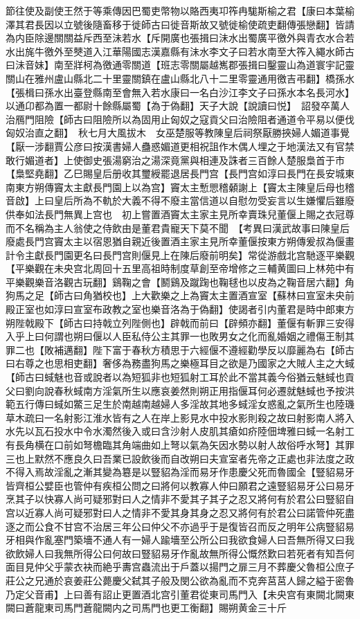 節往使及副使王然于等乘傳因巴蜀吏幣物以賂西夷卭筰冉駹斯榆之君【康曰本葉榆澤其君長因以立號後隨畜移于徙師古曰徙音斯故又號徙榆使疏吏翻傳張戀翻】皆請為内臣除邊關關益斥西至沬若水【斥開廣也張揖曰沬水出蜀廣平徼外與青衣水合若水出旄牛徼外至僰道入江華陽國志漢嘉縣有沬水李文子曰若水南至大筰入繩水師古曰沬音妹】南至牂柯為徼通零關道【班志零關屬越嶲郡張揖曰鑿靈山為道寰宇記靈關山在雅州盧山縣北二十里靈關鎮在盧山縣北八十二里零靈通用徼吉弔翻】橋孫水【張楫曰孫水出臺登縣南至會無入若水康曰一名白沙江李文子曰孫水本名長河水】以通卬都為置一都尉十餘縣屬蜀【為于偽翻】天子大說【說讀曰悦】　詔發卒萬人治鴈門阻險【師古曰阻險所以為固用止匈奴之寇貢父曰治險阻者通道令平易以便伐匈奴治直之翻】　秋七月大風拔木　女巫楚服等教陳皇后祠祭厭勝挾婦人媚道事覺【厭一涉翻賈公彦曰按漢書婦人蠱惑媚道更相祝詛作木偶人埋之于地漢法又有官禁敢行媚道者】上使御史張湯窮治之湯深竟黨與相連及誅者三百餘人楚服梟首于市【梟堅堯翻】乙巳賜皇后册收其璽綬罷退居長門宫【長門宫如淳曰長門在長安城東南東方朔傳竇太主獻長門園上以為宫】竇太主慙愳稽顙謝上【竇太主陳皇后母也稽音啟】上曰皇后所為不軌於大義不得不廢主當信道以自慰勿受妄言以生嫌懼后雖廢供奉如法長門無異上宫也　初上嘗置酒竇太主家主見所幸賣珠兒董偃上賜之衣冠尊而不名稱為主人翁使之侍飲由是董君貴寵天下莫不聞　【考異曰漢武故事曰陳皇后廢處長門宫竇太主以宿恩猶自親近後置酒主家主見所幸董偃按東方朔傳爰叔為偃畫計令主獻長門園更名曰長門宫則偃見上在陳后廢前明矣】常從游戲北宫馳逐平樂觀【平樂觀在未央宫北周回十五里高祖時制度草創至帝增修之三輔黄圖曰上林苑中有平樂觀樂音洛觀古玩翻】鷄鞠之會【鬭鷄及蹴踘也鞠毬也以皮為之鞠音居六翻】角狗馬之足【師古曰角猶校也】上大歡樂之上為竇太主置酒宣室【蘇林曰宣室未央前殿正室也如淳曰宣室布政教之室也樂音洛為于偽翻】使謁者引内董君是時中郎東方朔陛戟殿下【師古曰持戟立列陛側也】辟戟而前曰【辟頻亦翻】董偃有斬罪三安得入乎上曰何謂也朔曰偃以人臣私侍公主其罪一也敗男女之化而亂婚姻之禮傷王制其罪二也【敗補邁翻】陛下富于春秋方積思于六經偃不遵經勸學反以靡麗為右【師古曰右尊之也思相吏翻】奢侈為務盡狗馬之樂極耳目之欲是乃國家之大賊人主之大蜮【師古曰蜮魅也音或說者以為短狐非也短狐射工耳於此不當其義今俗猶云魅蜮也貢父曰劉向說春秋蜮南方淫氣所生以應哀姜然則朔正用指偃耳何必遷就魅蜮也予按洪範五行傳曰蜮如鱉三足生於南越南越婦人多淫故其地多蜮淫女惑亂之氣所生也陸璣草木疏曰一名射影江淮水皆有之人在岸上影見水中投水影則殺之故曰射影南人將入水先以瓦石投水中令水濁然後入或曰含沙射人皮肌其瘡如疥陸佃埤雅曰蜮一名射工有長角横在口前如弩檐臨其角端曲如上弩以氣為矢因水勢以射人故俗呼水弩】其罪三也上默然不應良久曰吾業已設飲後而自改朔曰夫宣室者先帝之正處也非法度之政不得入焉故淫亂之漸其變為簒是以豎貂為淫而易牙作患慶父死而魯國全【豎貂易牙皆齊桓公嬖臣也管仲有疾桓公問之曰將何以教寡人仲曰願君之遠豎貂易牙公曰易牙烹其子以快寡人尚可疑邪對曰人之情非不愛其子其子之忍又將何有於君公曰豎貂自宫以近寡人尚可疑邪對曰人之情非不愛其身其身之忍又將何有於君公曰諾管仲死盡逐之而公食不甘宫不治居三年公曰仲父不亦過乎于是復皆召而反之明年公病豎貂易牙相與作亂塞門築墻不通人有一婦人踰墻至公所公曰我欲食婦人曰吾無所得又曰我欲飲婦人曰我無所得公曰何故曰豎貂易牙作亂故無所得公慨然歎曰若死者有知吾何面目見仲父乎蒙衣袂而絶乎夀宫蟲流出于戶蓋以揚門之扉三月不葬慶父魯桓公庶子莊公之兄通於哀姜莊公薨慶父弑其子般及閔公欲為亂而不克奔莒莒人歸之縊于密魯乃定父音甫】上曰善有詔止更置酒北宫引董君從東司馬門入【未央宫有東闕北闕東闕曰蒼龍東司馬門蒼龍闕内之司馬門也更工衡翻】賜朔黄金三十斤